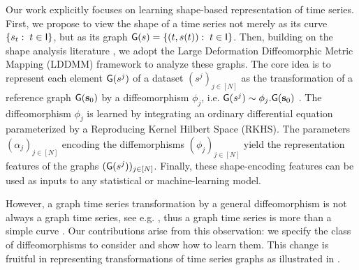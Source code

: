 Our work explicitly focuses on learning shape-based representation of time series.
First, we propose to view the shape of a time series not merely as its curve $\{s_t:\; t\in\mathsf{I}\}$, but as its graph $\mathsf{G}(s)=\{(t,s(t)):\; t\in \mathsf{I}\}$.
   Then, building on the shape analysis literature \cite{beg2005computing,vaillant2004statistics}, we adopt the Large Deformation Diffeomorphic Metric Mapping (LDDMM) framework \cite{beg2005computing,vaillant2004statistics} to analyze these graphs.
    The core idea is to represent each element $\mathsf{G}(s^j)$ of a dataset $(s^j)_{j\in[N]}$ as the transformation of a reference graph $\mathsf{G}(\mathbf{s}_0)$ by a diffeomorphism $\phi_j$, i.e. $\mathsf{G}(s^j) \sim \phi_j . \mathsf{G}(\mathbf{s}_0)$ .
    The diffeomorphism $\phi_j$ is learned by integrating an ordinary differential equation parameterized by a Reproducing Kernel Hilbert Space (RKHS).
     The parameters $(\alpha_j)_{j\in[N]}$ encoding the diffemorphisms $(\phi_j)_{j\in[N]}$ yield the representation features of the graphs $(\mathsf{G}(s^j))_{j\in[N]}$.
     Finally, these shape-encoding features can be used as inputs to any statistical or machine-learning model.

However, a graph time series transformation by a general diffeomorphism is not always a graph time series, see e.g. , thus a graph time series is more than a simple curve \cite{glaunes2008large}.
 Our contributions arise from this observation: we specify the class of diffeomorphisms to consider and show how to learn them.
  This change is fruitful in representing transformations of time series graphs as illustrated in .


        
